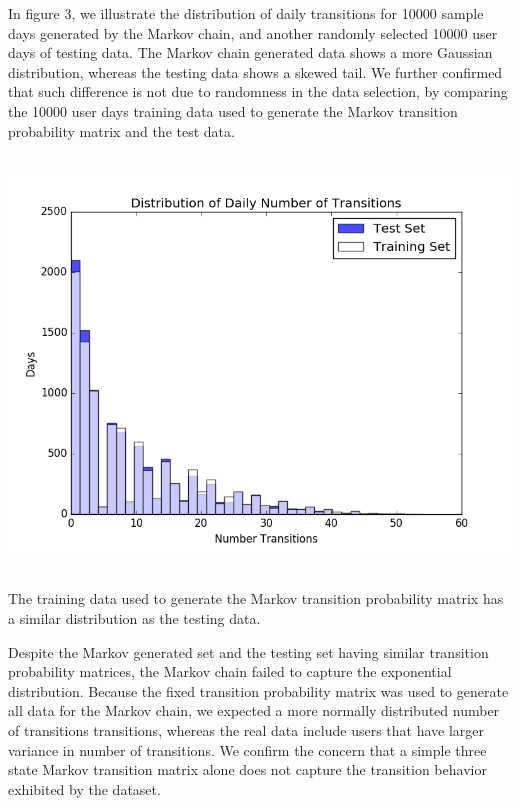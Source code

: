 \documentclass[]{article}
\newenvironment{Figure}
  {\par\medskip\noindent\minipage{\linewidth}}
  {\endminipage\par\medskip}
\begin{document}
In figure 3, we illustrate the distribution of daily transitions for 10000 sample days generated by the Markov chain, and another randomly selected 10000 user days of testing data. The Markov chain generated data shows a more Gaussian distribution, whereas the testing data shows a skewed tail. We further confirmed that such difference is not due to randomness in the data selection, by comparing the 10000 user days training data used to generate the Markov transition probability matrix and the test data.

\begin{Figure}
 \centering
 \includegraphics[height = 11cm, width =15cm]{markovTrainTest.png}
\end{Figure}

The training data used to generate the Markov transition probability matrix has a similar distribution as the testing data.

Despite the Markov generated set and the testing set having similar transition probability matrices, the Markov chain failed to capture the exponential distribution. Because the fixed transition probability matrix was used to generate all data for the Markov chain, we expected a more normally distributed number of transitions transitions, whereas the real data include users that have larger variance in number of transitions. We confirm the concern that a simple three state Markov transition matrix alone does not capture the transition behavior exhibited by the dataset.
\end{document}
